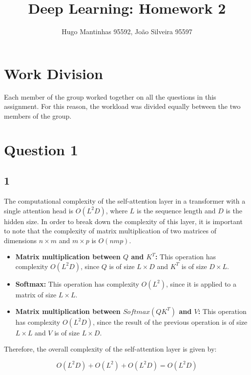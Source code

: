 \documentclass[11pt]{article}
\begin{document}
\title{Deep Learning: Homework 2}
\author{Hugo Mantinhas 95592, João Silveira 95597}

\maketitle

\section*{Work Division}

Each member of the group worked together on all the questions in this assignment. For this reason, the workload was divided equally between the two members of the group.

\section*{Question 1}

\subsection*{1}

The computational complexity of the self-attention layer in a transformer with a single attention head is \(O(L^2D)\), where \(L\) is the sequence length and \(D\) is the hidden size. In order to break down the complexity of this layer, it is important to note that the complexity of matrix multiplication of two matrices of dimensions \(n \times m\) and \(m \times p\) is \(O(nmp)\).

\begin{itemize}
    \item \textbf{Matrix multiplication between \(Q\) and \(K^T\):} This operation has complexity \(O(L^2D)\), since \(Q\) is of size \(L \times D\) and \(K^T\) is of size \(D \times L\).
    \item \textbf{Softmax:} This operation has complexity \(O(L^2)\), since it is applied to a matrix of size \(L \times L\).
    \item \textbf{Matrix multiplication between \(Softmax(QK^T)\) and \(V\):} This operation has complexity \(O(L^2D)\), since the result of the previous operation is of size \(L \times L\) and \(V\) is of size \(L \times D\).
\end{itemize}

Therefore, the overall complexity of the self-attention layer is given by: 

\[
O(L^2D) + O(L^2) + O(L^2D) = O(L^2D)
\]
\end{document}
